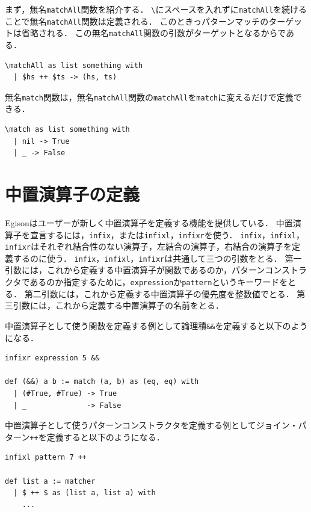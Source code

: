 まず，無名\lstinline{matchAll}関数を紹介する．
\lstinline{\}にスペースを入れずに\lstinline{matchAll}を続けることで無名\lstinline{matchAll}関数は定義される．
このときっパターンマッチのターゲットは省略される．
この無名\lstinline{matchAll}関数の引数がターゲットとなるからである．
\begin{lstlisting}[language=egison,numbers=none]
\matchAll as list something with
  | $hs ++ $ts -> (hs, ts)
\end{lstlisting}

無名\lstinline{match}関数は，無名\lstinline{matchAll}関数の\lstinline{matchAll}を\lstinline{match}に変えるだけで定義できる．
\begin{lstlisting}[language=egison,numbers=none]
\match as list something with
  | nil -> True
  | _ -> False
\end{lstlisting}

\section{中置演算子の定義}

Egisonはユーザーが新しく中置演算子を定義する機能を提供している．
中置演算子を宣言するには，\lstinline{infix}，または\lstinline{infixl}，\lstinline{infixr}を使う．
\lstinline{infix}，\lstinline{infixl}，\lstinline{infixr}はそれぞれ結合性のない演算子，左結合の演算子，右結合の演算子を定義するのに使う．
\lstinline{infix}，\lstinline{infixl}，\lstinline{infixr}は共通して三つの引数をとる．
第一引数には，これから定義する中置演算子が関数であるのか，パターンコンストラクタであるのか指定するために，\lstinline{expression}か\lstinline{pattern}というキーワードをとる．
第二引数には，これから定義する中置演算子の優先度を整数値でとる．
第三引数には，これから定義する中置演算子の名前をとる．

中置演算子として使う関数を定義する例として論理積\lstinline{&&}を定義すると以下のようになる．
\begin{lstlisting}[language=egison,numbers=none]
infixr expression 5 &&

def (&&) a b := match (a, b) as (eq, eq) with
  | (#True, #True) -> True
  | _              -> False
\end{lstlisting}

中置演算子として使うパターンコンストラクタを定義する例としてジョイン・パターン\lstinline{++}を定義すると以下のようになる．
\begin{lstlisting}[language=egison,numbers=none]
infixl pattern 7 ++

def list a := matcher
  | $ ++ $ as (list a, list a) with
    ...
\end{lstlisting}

